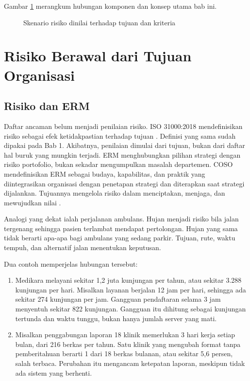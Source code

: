 Gambar \ref{fig:ch05-ilustrasi-bab} merangkum hubungan komponen dan konsep utama bab ini.
\begin{figure}[!htb]
  \centering
  
  \caption{Skenario risiko dinilai terhadap tujuan dan kriteria}
  \label{fig:ch05-ilustrasi-bab}
\end{figure}

\section{Risiko Berawal dari Tujuan Organisasi}

\subsection*{Risiko dan ERM}

Daftar ancaman belum menjadi penilaian risiko. ISO 31000:2018 mendefinisikan risiko sebagai efek
ketidakpastian terhadap tujuan \cite{iso31000-2018}. Definisi yang sama sudah dipakai pada Bab 1.
Akibatnya, penilaian dimulai dari tujuan, bukan dari daftar hal buruk yang mungkin terjadi. ERM
menghubungkan pilihan strategi dengan risiko portofolio, bukan sekadar mengumpulkan masalah
departemen. COSO mendefinisikan ERM sebagai budaya, kapabilitas, dan praktik yang diintegrasikan
organisasi dengan penetapan strategi dan diterapkan saat strategi dijalankan. Tujuannya mengelola
risiko dalam menciptakan, menjaga, dan mewujudkan nilai \cite{cosoerm2017,c05-nist-ir8286r1}.

Analogi yang dekat ialah perjalanan ambulans. Hujan menjadi risiko bila jalan tergenang sehingga
pasien terlambat mendapat pertolongan. Hujan yang sama tidak berarti apa-apa bagi ambulans yang
sedang parkir. Tujuan, rute, waktu tempuh, dan alternatif jalan menentukan keputusan.

Dua contoh memperjelas hubungan tersebut:
\begin{enumerate}
  \item Medikara melayani sekitar 1,2 juta kunjungan per tahun, atau sekitar 3.288 kunjungan per
  hari. Misalkan layanan berjalan 12 jam per hari, sehingga ada sekitar 274 kunjungan per jam.
  Gangguan pendaftaran selama 3 jam menyentuh sekitar 822 kunjungan. Gangguan itu dihitung sebagai
  kunjungan tertunda dan waktu tunggu, bukan hanya jumlah server yang mati.
  \item Misalkan penggabungan laporan 18 klinik memerlukan 3 hari kerja setiap bulan, dari 216
  berkas per tahun. Satu klinik yang mengubah format tanpa pemberitahuan berarti 1 dari 18 berkas
  bulanan, atau sekitar 5,6 persen, salah terbaca. Perubahan itu mengancam ketepatan laporan,
  meskipun tidak ada sistem yang berhenti.
\end{enumerate}

